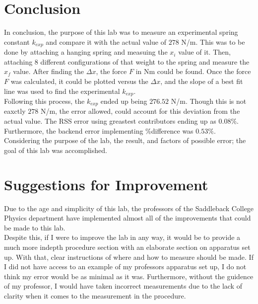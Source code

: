 \begingroup
\let\clearpage\relax\chapter{Conclusion}

In conclusion, the purpose of this lab was to measure an experimental spring 
constant $k_{exp}$ and compare it with the actual value of $278$ N/m. This was to be done 
by attaching a hanging spring and measuing the $x_i$ value of it. Then, attaching
8 different configurations of that weight to the spring and measure the $x_f$
value. After finding the $\Delta x$, the force $F$ in Nm could be found.
Once the force $F$ was calculated, it could be plotted versus the $\Delta x$,
and the slope of a best fit line was used to find the experimental $k_{exp}$.\\

\noindent Following this process, the $k_{exp}$ ended up being $276.52$ N/m. Though this is not
eaxctly $278$ N/m, the error allowed, could account for this deviation from the actual
value. The RSS error using greastest contributors ending up as $0.08\%$.\\

\noindent Furthermore, the backend error implementing \%difference was $0.53\%$.\\

\noindent Considering the purpose of the lab, the result, and factors of possible error;
the goal of this lab was accomplished.

\chapter{Suggestions for Improvement}
\endgroup

\noindent Due to the age and simplicity of this lab, the professors
of the Saddleback College Physics department have implemented almost all of the
improvements that could be made to this lab.\\

\noindent Despite this, if I were to improve the lab in any way, it would be to 
provide a much more indepth procedure section with an elaborate section on 
apparatus set up. With that, clear instructions of where and how to measure
should be made. If I did not have access to an example of my professors 
apparatus set up, I do not think my error would be as minimal as it was. Furthermore,
without the guidence of my professor, I would have taken incorrect measurements due
to the lack of clarity when it comes to the measurement in the procedure.\\